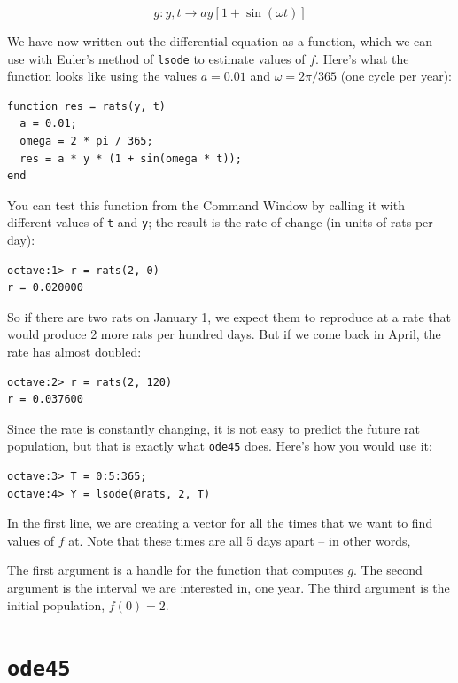 \documentclass{book}
\begin{document}
\[ g : y, t \to a y \left[1 + \sin (\omega t) \right] \]

We have now written out the differential equation as a function, which we
can use with Euler's method of {\tt lsode} to estimate values of $f$. Here's
what the function looks like using the values $a = 0.01$
and $\omega = 2 \pi/365$ (one cycle per year):

\begin{verbatim}
function res = rats(y, t)
  a = 0.01;
  omega = 2 * pi / 365;
  res = a * y * (1 + sin(omega * t));
end
\end{verbatim}

You can test this function from the Command Window by calling it with
different values of {\tt t} and {\tt y}; the result is the rate of
change (in units of rats per day):

\begin{verbatim}
octave:1> r = rats(2, 0)
r = 0.020000
\end{verbatim}

So if there are two rats on January 1, we expect them to reproduce
at a rate that would produce 2 more rats per hundred days. But
if we come back in April, the rate has almost doubled:

\begin{verbatim}
octave:2> r = rats(2, 120)
r = 0.037600
\end{verbatim}

Since the rate is constantly changing, it is not easy to predict
the future rat population, but that is exactly what {\tt ode45} does.
Here's how you would use it:

\begin{verbatim}
octave:3> T = 0:5:365;
octave:4> Y = lsode(@rats, 2, T)
\end{verbatim}

In the first line, we are creating a vector for all the times that we want to
find values of $f$ at. Note that these times are all 5 days apart -- in other
words, 

The first argument is a handle for the function that
computes $g$. The second argument is the interval we are interested
in, one year. The third argument is the initial population, $f(0) = 2$.

\section{{\tt ode45}}
\label{ode45}

\end{document}
